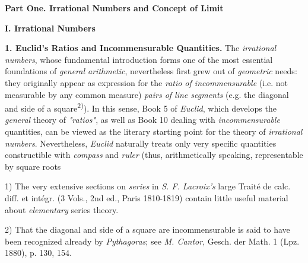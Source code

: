 \begin{center}
{\fontsize{13}{13}\selectfont\textbf{Part One. Irrational Numbers and Concept of Limit}}

{\fontsize{12}{12}\selectfont\textbf{I. Irrational Numbers}}
\end{center}

{\fontsize{11}{11}\selectfont\textbf{1. Euclid's Ratios and Incommensurable Quantities.}} The \textit{irrational numbers}, whose fundamental introduction forms one of the most essential foundations of \textit{general arithmetic}, nevertheless first grew out of \textit{geometric} needs: they originally appear as expression for the \textit{ratio of incommensurable} (i.e. not measurable by any common measure) \textit{pairs of line segments} (e.g. the diagonal and side of a square\textsuperscript{2)}). In this sense, Book 5 of \textit{Euclid}, which develops the \textit{general} theory of \textit{"ratios"}, as well as Book 10 dealing with \textit{incommensurable} quantities, can be viewed as the literary starting point for the theory of \textit{irrational numbers}. Nevertheless, \textit{Euclid} naturally treats only very specific quantities constructible with \textit{compass} and \textit{ruler} (thus, arithmetically speaking, representable by square roots

\vfill
\leftline{\rule{2in}{0.4pt}}
\vspace{0.2cm}
{
\footnotesize
1) The very extensive sections on \textit{series} in \textit{S. F. Lacroix's} large Traité de calc. diff. et intégr. (3 Vols., 2nd ed., Paris 1810-1819) contain little useful material about \textit{elementary} series theory.

2) That the diagonal and side of a square are incommensurable is said to have been recognized already by \textit{Pythagoras}; see \textit{M. Cantor}, Gesch. der Math. 1 (Lpz. 1880), p. 130, 154.

}
